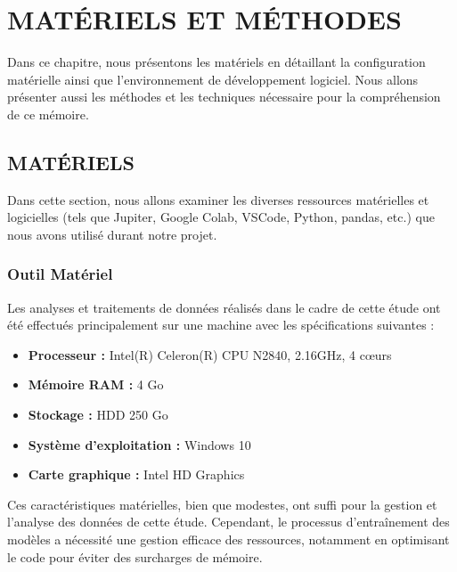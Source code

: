 \chapter{MATÉRIELS ET MÉTHODES}
Dans ce chapitre, nous présentons les matériels en détaillant la configuration matérielle ainsi que l’environnement de développement logiciel. Nous allons présenter aussi les méthodes et les techniques nécessaire pour la compréhension de ce mémoire.
\section{MATÉRIELS}
Dans cette section, nous allons examiner les diverses ressources matérielles et logicielles (tels que Jupiter, Google Colab, VSCode, Python, pandas, etc.) que nous avons utilisé durant notre projet.
\subsection{Outil Matériel}
Les analyses et traitements de données réalisés dans le cadre de cette étude ont été effectués principalement sur une machine avec les spécifications suivantes :

\begin{itemize}
	\item \textbf{Processeur :} Intel(R) Celeron(R) CPU N2840, 2.16GHz, 4 cœurs
	\item \textbf{Mémoire RAM :} 4 Go
	\item \textbf{Stockage :} HDD 250 Go
	\item \textbf{Système d'exploitation :} Windows 10
	\item \textbf{Carte graphique :} Intel HD Graphics
\end{itemize}

Ces caractéristiques matérielles, bien que modestes, ont suffi pour la gestion et l'analyse des données de cette étude. Cependant, le processus d'entraînement des modèles a nécessité une gestion efficace des ressources, notamment en optimisant le code pour éviter des surcharges de mémoire.

